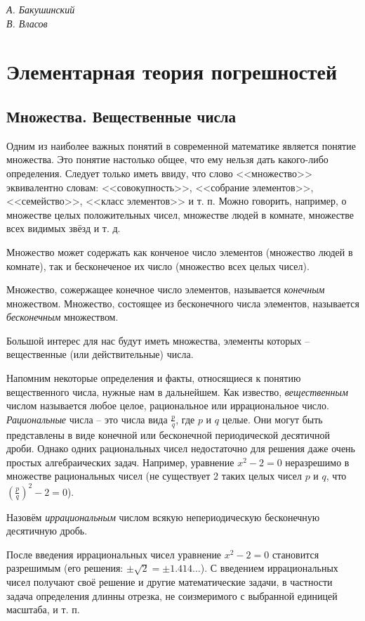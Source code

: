 \begin{flushright}
	\textit{А. Бакушинский\\
		В. Власов
	}
\end{flushright}
\chapter{Элементарная теория погрешностей}
\section{Множества. Вещественные числа}

Одним из наиболее важных понятий в современной математике является понятие
множества. Это понятие настолько общее, что ему нельзя дать какого-либо
определения. Следует только иметь ввиду, что слово <<множество>> эквивалентно
словам: <<совокупность>>, <<собрание элементов>>, <<семейство>>, <<класс
элементов>> и т. п. Можно говорить, например, о множестве целых положительных
чисел, множестве людей в комнате, множестве всех видимых звёзд и т. д.

Множество может содержать как конченое число элементов (множество людей в
комнате), так и бесконеченое их число (множество всех целых чисел).

Множество, сожержащее конечное число элементов, называется \textit{конечным}
множеством. Множество, состоящее из бесконечного числа элементов, называется
\textit{бесконечным} множеством.

Большой интерес для нас будут иметь множества, элементы которых -- вещественные
(или действительные) числа.

Напомним некоторые определения и факты, относящиеся к понятию вещественного
числа, нужные нам в дальнейшем. Как извество, \textit{вещественным} числом
называется любое целое, рациональное или иррациональное число.
\textit{Рациональные} числа -- это числа вида $\frac{p}{q}$, где $p$ и $q$
целые. Они могут быть представлены в виде конечной или бесконечной периодической
десятичной дроби. Однако одних рациональных чисел недостаточно для решения даже
очень простых алгебраических задач. Например, уравнение $x^2 - 2 = 0$
неразрешимо в множестве рациональных чисел (не существует 2 таких целых чисел
$p$ и $q$, что $(\frac{p}{q})^2 - 2 = 0$).

Назовём \textit{иррациональным} числом всякую непериодическую бесконечную
десятичную дробь.

После введения иррациональных чисел уравнение $x^2 - 2 = 0$ становится
разрешимым (его решения: $\pm\sqrt{2} = \pm 1.414\ldots$). С введением
иррациональных чисел получают своё решение и другие математические задачи, в
частности задача определения длинны отрезка, не соизмеримого с выбранной
единицей масштаба, и т. п.

